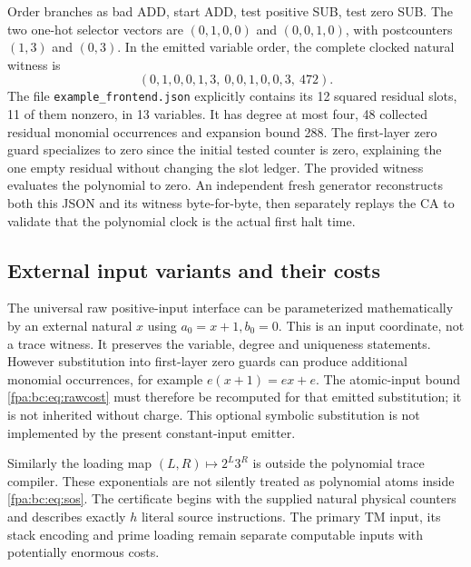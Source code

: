 \documentclass[11pt,a4paper]{article}
\numberwithin{equation}{section}
\begin{document}
Order branches as bad ADD, start ADD, test positive SUB, test zero SUB.
The two one-hot selector vectors are $(0,1,0,0)$ and $(0,0,1,0)$, with
postcounters $(1,3)$ and $(0,3)$. In the emitted variable order, the complete
clocked natural witness is
\[
 (0,1,0,0,1,3,\ 0,0,1,0,0,3,\ 472).
\]
The file \texttt{example\_frontend.json} explicitly contains its 12 squared
residual slots, 11 of them nonzero, in 13 variables. It has degree at most
four, 48 collected residual monomial occurrences and expansion bound 288.
The first-layer zero guard specializes to zero since the initial tested
counter is zero, explaining the one empty residual without changing the slot
ledger. The provided witness evaluates the polynomial to zero. An independent
fresh generator reconstructs both this JSON and its witness byte-for-byte,
then separately replays the CA to validate that the polynomial clock is the
actual first halt time.

\subsection{External input variants and their costs}
The universal raw positive-input interface can be parameterized mathematically
by an external natural $x$ using $a_0=x+1,b_0=0$. This is an input coordinate,
not a trace witness. It preserves the variable, degree and uniqueness
statements. However substitution into first-layer zero guards can produce
additional monomial occurrences, for example
$e(x+1)=ex+e$. The atomic-input bound \eqref{fpa:bc:eq:rawcost} must therefore be
recomputed for that emitted substitution; it is not inherited without charge.
This optional symbolic substitution is not implemented by the present
constant-input emitter.

Similarly the loading map $(L,R)\mapsto2^L3^R$ is outside the polynomial
trace compiler. These exponentials are not silently treated as polynomial
atoms inside \eqref{fpa:bc:eq:sos}. The certificate begins with the supplied natural
physical counters and describes exactly $h$ literal source instructions.
The primary TM input, its stack encoding and prime loading remain separate
computable inputs with potentially enormous costs.
\end{document}
